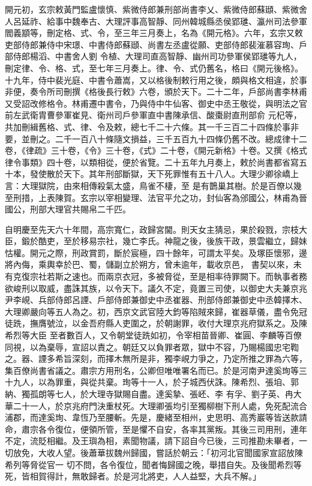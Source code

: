 \begin{pinyinscope}
 開元初，玄宗敕黃門監盧懷慎、紫微侍郎兼刑部尚書李乂、紫微侍郎蘇頲、紫微舍人呂延祚、給事中魏奉古、大理評事高智靜、同州韓城縣丞侯郢璡、瀛州司法參軍閻義顓等，刪定格、式、令，至三年三月奏上，名為《開元格》。六年，玄宗又敕吏部侍郎兼侍中宋璟、中書侍郎蘇頲、尚書左丞盧從願、吏部侍郎裴漼慕容珣、戶部侍郎楊滔、中書舍人劉
 令植、大理司直高智靜、幽州司功參軍侯郢璡等九人，刪定律、令、格、式，至七年三月奏上。律、令、式仍舊名，格曰《開元後格》。十九年，侍中裴光庭、中書令蕭嵩，又以格後制敕行用之後，頗與格文相違，於事非便，奏令所司刪撰《格後長行敕》六卷，頒於天下。二十二年，戶部尚書李林甫又受詔改修格令。林甫遷中書令，乃與侍中牛仙客、御史中丞王敬從，與明法之官前左武衛胄曹參軍崔見、衛州司戶參軍直中書陳承信、酸棗尉直刑部俞
 元杞等，共加刪緝舊格、式、律、令及敕，總七千二十六條。其一千三百二十四條於事非要，並刪之。二千一百八十條隨文損益，三千五百九十四條仍舊不改。總成律十二卷，《律疏》三十卷，《令》三十卷，《式》二十卷，《開元新格》十卷。又撰《格式律令事類》四十卷，以類相從，便於省覽。二十五年九月奏上，敕於尚書都省寫五十本，發使散於天下。其年刑部斷獄，天下死罪惟有五十八人。大理少卿徐嶠上言：大理獄院，由來相傳殺氣太盛，鳥雀不棲，至
 是有鵲巢其樹。於是百僚以幾至刑措，上表陳賀。玄宗以宰相變理、法官平允之功，封仙客為邠國公，林甫為晉國公，刑部大理官共賜帛二千匹。



 自明慶至先天六十年間，高宗寬仁，政歸宮閫。則天女主猜忌，果於殺戮，宗枝大臣，鍛於酷吏，至於移易宗社，幾亡李氏。神龍之後，後族干政，景雲繼立，歸妹怙權。開元之際，刑政賞罰，斷於宸極，四十餘年，可謂太平矣。及塚臣懷邪，邊將內侮，乘輿幸於巴、蜀，儲副立於朔方，曾未逾年，載收京邑，
 書契以來，未有克復宗社若斯之速也。而兩京衣冠，多被脅從，至是相率待罪闕下。而執事者務欲峻刑以取威，盡誅其族，以令天下。議久不定，竟置三司使，以御史大夫兼京兆尹李峴、兵部侍郎呂諲、戶部侍郎兼御史中丞崔器、刑部侍郎兼御史中丞韓擇木、大理卿嚴向等五人為之。初，西京文武官陸大鈞等陷賊來歸，崔器草儀，盡令免冠徒跣，撫膺號泣，以金吾府縣人吏圍之，於朝謝罪，收付大理京兆府獄系之。及陳希烈等大臣
 至者數百人，又令朝堂徒跣如初，令宰相苗晉卿、崔圓、李麟等百僚同視，以為棄辱，宣詔以責之。朝廷又以負罪者眾，獄中不容，乃賜楊國忠宅鞫之。器、諲多希旨深刻，而擇木無所是非，獨李峴力爭之，乃定所推之罪為六等，集百僚尚書省議之。肅宗方用刑名，公卿但唯唯署名而已。於是河南尹達奚珣等三十九人，以為罪重，與從共棄。珣等十一人，於子城西伏誅。陳希烈、張垍、郭納、獨孤朗等七人，於大理寺獄賜自盡。達奚摯、張岯、李
 有孚、劉子英、冉大華二十一人，於京兆府門決重杖死。大理卿張均引至獨柳樹下刑人處，免死配流合浦郡，而達奚珣、韋恆乃至腰斬。先是，慶緒至相州，史思明、高秀巖等皆送款請命，肅宗各令復位，便領所管，至是懼不自安，各率其黨叛。其後三司用刑，連年不定，流貶相繼。及王璵為相，素聞物議，請下詔自今已後，三司推勘未畢者，一切放免，大收人望。後蕭華拔魏州歸國，嘗話於朝云：「初河北官聞國家宣詔放陳希列等脅從官一
 切不問，各令復位，聞者悔歸國之晚，舉措自失。及後聞希烈等死，皆相賀得計，無敢歸者。於是河北將吏，人人益堅，大兵不解。」




\end{pinyinscope}
